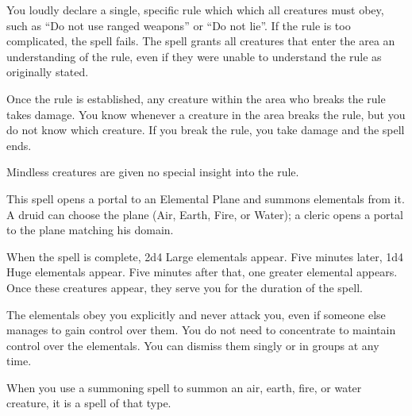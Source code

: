 \spelldur{\durshort}
\begin{spelleffect}
    You loudly declare a single, specific rule which which all creatures must obey, such as ``Do not use ranged weapons'' or ``Do not lie''. If the rule is too complicated, the spell fails. The spell grants all creatures that enter the area an understanding of the rule, even if they were unable to understand the rule as originally stated.

    Once the rule is established, any creature within the area who breaks the rule takes damage. You know whenever a creature in the area breaks the rule, but you do not know which creature. If you break the rule, you take damage and the spell ends.
\end{spelleffect}
\begin{spellnotes}
    Mindless creatures are given no special insight into the rule.
\end{spellnotes}



\spellrng{\rngmed}
\begin{spelleffect}
  This spell opens a portal to an Elemental Plane and summons elementals from it. A druid can choose the plane (Air, Earth, Fire, or Water); a cleric opens a portal to the plane matching his domain.
  \par When the spell is complete, 2d4 Large elementals appear. Five minutes later, 1d4 Huge elementals appear. Five minutes after that, one greater elemental appears. Once these creatures appear, they serve you for the duration of the spell.
  \par The elementals obey you explicitly and never attack you, even if someone else manages to gain control over them. You do not need to concentrate to maintain control over the elementals. You can dismiss them singly or in groups at any time.
  \par When you use a summoning spell to summon an air, earth, fire, or water creature, it is a spell of that type.
\end{spelleffect}

